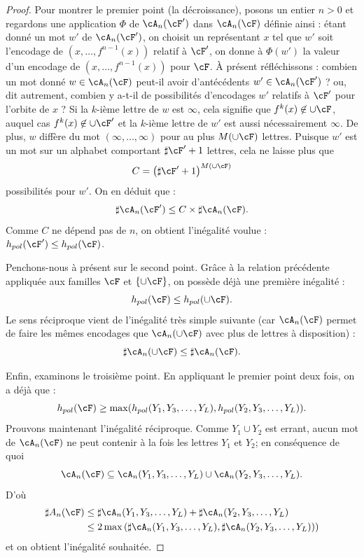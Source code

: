 \begin{proof}
Pour montrer le premier point (la {décroissance}), posons un entier $n > 0$ et regardons une application $\Phi$ de $\cA_n(\cF')$ dans $\cA_n(\cF)$ définie ainsi : étant donné un mot $w'$ de $\cA_n(\cF')$, on choisit un représentant $x$ tel que $w'$ soit l'encodage de $(x, \dots, f^{n-1}(x))$ relatif à $\cF'$, on donne à $\Phi(w')$ la valeur d'un encodage de $(x, \dots, f^{n-1}(x))$ pour $\cF$. \`A présent réfléchissons : combien un mot {donné} $w \in \cA_n(\cF)$ peut-il avoir d'antécédents {$w' \in \cA_n(\cF')$} ? ou, dit autrement, combien y a-t-il de possibilités d'encodages $w'$ relatifs à $\cF'$ pour l'orbite de $x$ ? Si la $k$-ième lettre de $w$ est \og$\infty$\fg, cela signifie que $f^k(x) \not \in \cup \cF$, auquel cas $f^k(x) \not \in \cup \cF'$ et la $k$-ième lettre de $w'$ est aussi nécessairement \og$\infty$\fg. De plus, $w$ diffère du mot $(\infty, \dots, \infty)$ pour au plus $M(\cup \cF)$ lettres. Puisque $w'$ est un mot sur un alphabet comportant $\sharp \cF'+1$ lettres, cela ne laisse plus que
\[
C = \left(\sharp \cF'+1 \right)^{M(\cup \cF)}
\]
possibilités pour $w'$. On en déduit que :
\[
\sharp \cA_n(\cF') \leq C \times \sharp \cA_n(\cF).
\]
Comme $C$ ne dépend pas de $n$, on obtient l'inégalité voulue : $h_{pol}(\cF') \leq h_{pol}(\cF)$.


Penchons-nous à présent sur le second point. Grâce à la relation précédente appliquée aux familles $\cF$ et $\{\cup \cF\}$, on possède déjà une première inégalité :
\[
h_{pol}(\cF) \leq h_{pol}(\cup \cF).
\]
Le sens réciproque vient de l'inégalité très simple suivante (car $\cA_n(\cF)$ permet de faire les mêmes encodages que $\cA_n(\cup \cF)$ avec plus de lettres à disposition) :
\[
\sharp \cA_n(\cup \cF) \leq \sharp \cA_n(\cF).
\]


Enfin, examinons le troisième point. En appliquant le premier point deux fois, on a déjà que :
\[
h_{pol}(\cF) \geq \max(h_{pol}(Y_{1},Y_3, \dots, Y_{L}), h_{pol}(Y_{2},Y_3, \dots, Y_{L})).
\]
Prouvons maintenant l'inégalité réciproque. Comme $Y_1\cup Y_2$ est errant, aucun mot de $\cA_n(\cF)$ ne peut contenir à la fois les lettres \og$Y_1$\fg{} et \og$Y_2$\fg; en conséquence de quoi
\[
\cA_n(\cF) \subseteq \cA_n(Y_1, Y_3, \dots, Y_L) \cup \cA_n(Y_2, Y_3, \dots, Y_L).
\]
D'où
\begin{align*}
\sharp A_{n}(\cF) & \leq \sharp \cA_n(Y_1, Y_3, \dots, Y_L) +\sharp \cA_n(Y_2, Y_3, \dots, Y_L) \\
& \leq 2 \max \left(\sharp \cA_n(Y_1, Y_3, \dots, Y_L), \sharp \cA_n(Y_2, Y_3, \dots, Y_L))\right)
\end{align*}
et on obtient l'inégalité souhaitée.
\end{proof}

